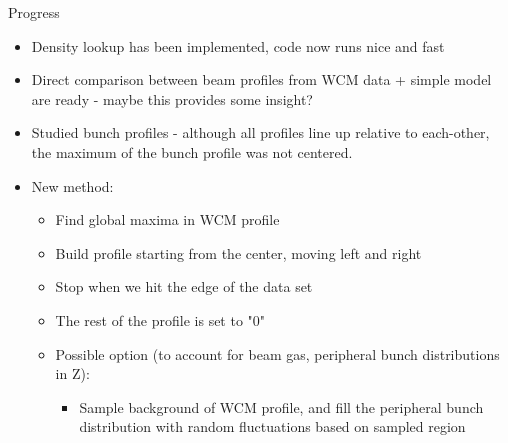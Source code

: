 \begin{frame}{Progress}
	\begin{itemize}
    \item Density lookup has been implemented, code now runs nice and fast
		\item Direct comparison between beam profiles from WCM data + simple model
			are ready - maybe this provides some insight?
		\item Studied bunch profiles - although all profiles line up relative to
			each-other, the maximum of the bunch profile was not centered.
		\item New method:
			\begin{itemize}
				\item Find global maxima in WCM profile
				\item Build profile starting from the center, moving left and right
				\item Stop when we hit the edge of the data set
				\item The rest of the profile is set to "0"
				\item Possible option (to account for beam gas, peripheral bunch
					distributions in Z):
					\begin{itemize}
						\item Sample background of WCM profile, and fill the peripheral bunch
							distribution with random fluctuations based on sampled region
					\end{itemize}
			\end{itemize}
	\end{itemize}
\end{frame}
